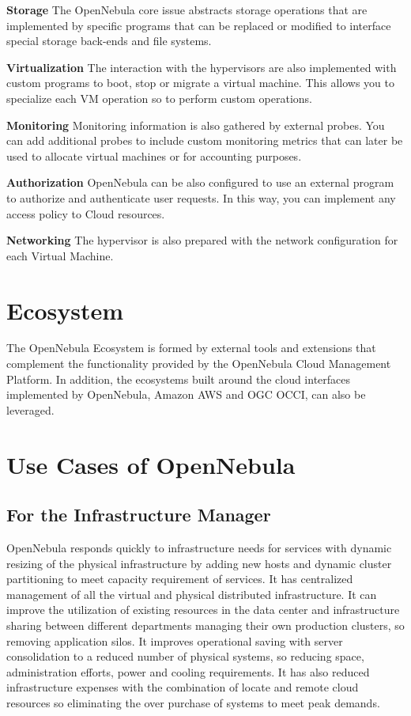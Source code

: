 \documentclass[9pt,twocolumn,twoside]{styles/osajnl}
\begin{document}
\textbf{Storage} The OpenNebula core issue abstracts storage 
operations that are implemented by specific programs that can be 
replaced or modified to interface special storage back-ends and file 
systems.

\textbf{Virtualization} The interaction with the hypervisors are also 
implemented with custom programs to boot, stop or migrate a virtual 
machine. This allows you to specialize each VM operation so to 
perform custom operations.

\textbf{Monitoring} Monitoring information is also gathered by 
external probes. You can add additional probes to include custom 
monitoring metrics that can later be used to allocate virtual 
machines or for accounting purposes.

\textbf{Authorization} OpenNebula can be also configured to use an 
external program to authorize and authenticate user requests. In this 
way, you can implement any access policy to Cloud resources.

\textbf{Networking} The hypervisor is also prepared with the network 
configuration for each Virtual Machine.

\section{Ecosystem}

The {OpenNebula Ecosystem}\cite{www-opennebula-ecosystem} is formed 
by external tools and extensions 
that complement the functionality provided by the OpenNebula Cloud 
Management Platform. In addition, the ecosystems built around the 
cloud interfaces implemented by OpenNebula, Amazon AWS and OGC OCCI, 
can also be leveraged. 

\section{Use Cases of OpenNebula}

\subsection{For the Infrastructure Manager}

OpenNebula responds quickly to infrastructure needs for services with 
dynamic resizing of the physical infrastructure by adding new hosts 
and dynamic cluster partitioning to meet capacity requirement of 
services. It has centralized management of all the virtual and 
physical distributed infrastructure. It can improve the utilization 
of existing resources in the data center and infrastructure sharing 
between different departments managing their own production clusters, 
so removing application silos. It improves operational saving with 
server consolidation to a reduced number of physical systems, so 
reducing space, administration efforts, power and cooling 
requirements. It has also reduced infrastructure expenses with the 
combination of locate and remote cloud resources so eliminating the 
over purchase of systems to meet peak demands.
\end{document}
